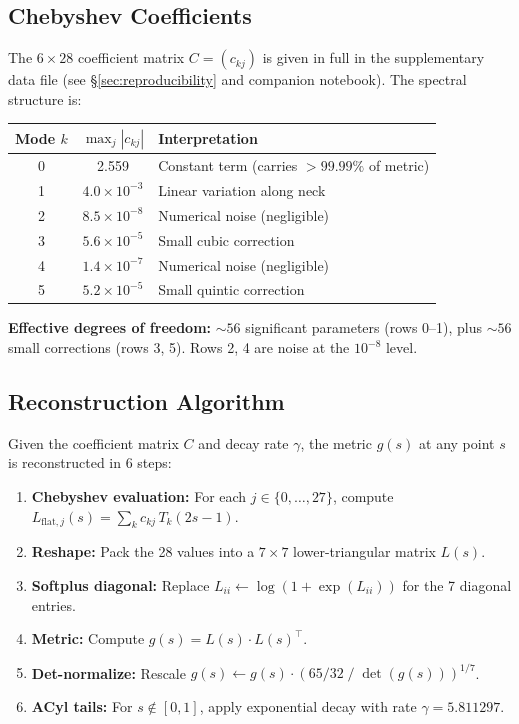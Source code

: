 \documentclass[11pt,a4paper]{article}
\theoremstyle{remark}
\begin{document}
\subsection{Chebyshev Coefficients}\label{sec:cheb_coeffs}

The $6 \times 28$ coefficient matrix $C = (c_{kj})$ is given in full in the supplementary
data file (see \S\ref{sec:reproducibility} and companion notebook). The spectral structure is:

\begin{table}[H]
\centering
\begin{tabular}{ccl}
\toprule
\textbf{Mode} $k$ & $\max_j |c_{kj}|$ & \textbf{Interpretation} \\
\midrule
0 & 2.559 & Constant term (carries $> 99.99\%$ of metric) \\
1 & $4.0 \times 10^{-3}$ & Linear variation along neck \\
2 & $8.5 \times 10^{-8}$ & Numerical noise (negligible) \\
3 & $5.6 \times 10^{-5}$ & Small cubic correction \\
4 & $1.4 \times 10^{-7}$ & Numerical noise (negligible) \\
5 & $5.2 \times 10^{-5}$ & Small quintic correction \\
\bottomrule
\end{tabular}
\end{table}

\textbf{Effective degrees of freedom:} ${\sim}56$ significant parameters (rows 0--1), plus ${\sim}56$ small
corrections (rows 3, 5). Rows 2, 4 are noise at the $10^{-8}$ level.

\subsection{Reconstruction Algorithm}\label{sec:reconstruction}

Given the coefficient matrix $C$ and decay rate $\gamma$, the metric $g(s)$ at any point $s$ is
reconstructed in 6 steps:

\begin{enumerate}
    \item \textbf{Chebyshev evaluation:} For each $j \in \{0, \ldots, 27\}$, compute $L_{\mathrm{flat},j}(s) = \sum_k c_{kj}\, T_k(2s{-}1)$.
    \item \textbf{Reshape:} Pack the 28 values into a $7 \times 7$ lower-triangular matrix $L(s)$.
    \item \textbf{Softplus diagonal:} Replace $L_{ii} \leftarrow \log(1 + \exp(L_{ii}))$ for the 7 diagonal entries.
    \item \textbf{Metric:} Compute $g(s) = L(s) \cdot L(s)^\top$.
    \item \textbf{Det-normalize:} Rescale $g(s) \leftarrow g(s) \cdot (65/32 \;/\; \det(g(s)))^{1/7}$.
    \item \textbf{ACyl tails:} For $s \notin [0, 1]$, apply exponential decay with rate $\gamma = 5.811297$.
\end{enumerate}
\end{document}
